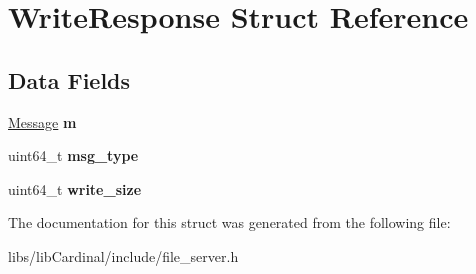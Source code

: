\hypertarget{structWriteResponse}{}\section{Write\+Response Struct Reference}
\label{structWriteResponse}
\subsection*{Data Fields}
\begin{DoxyCompactItemize}
\item 
\hyperlink{structMessage}{Message} {\bfseries m}\hypertarget{structWriteResponse_ae30c6f66d9950af3f00097c3f69b4ece}{}\label{structWriteResponse_ae30c6f66d9950af3f00097c3f69b4ece}

\item 
uint64\+\_\+t {\bfseries msg\+\_\+type}\hypertarget{structWriteResponse_a57b004265cd29cc6fe5b9708fcdff69c}{}\label{structWriteResponse_a57b004265cd29cc6fe5b9708fcdff69c}

\item 
uint64\+\_\+t {\bfseries write\+\_\+size}\hypertarget{structWriteResponse_a7a772d805cb01150a073864171f6a4ce}{}\label{structWriteResponse_a7a772d805cb01150a073864171f6a4ce}

\end{DoxyCompactItemize}


The documentation for this struct was generated from the following file\+:\begin{DoxyCompactItemize}
\item 
libs/lib\+Cardinal/include/file\+\_\+server.\+h\end{DoxyCompactItemize}
